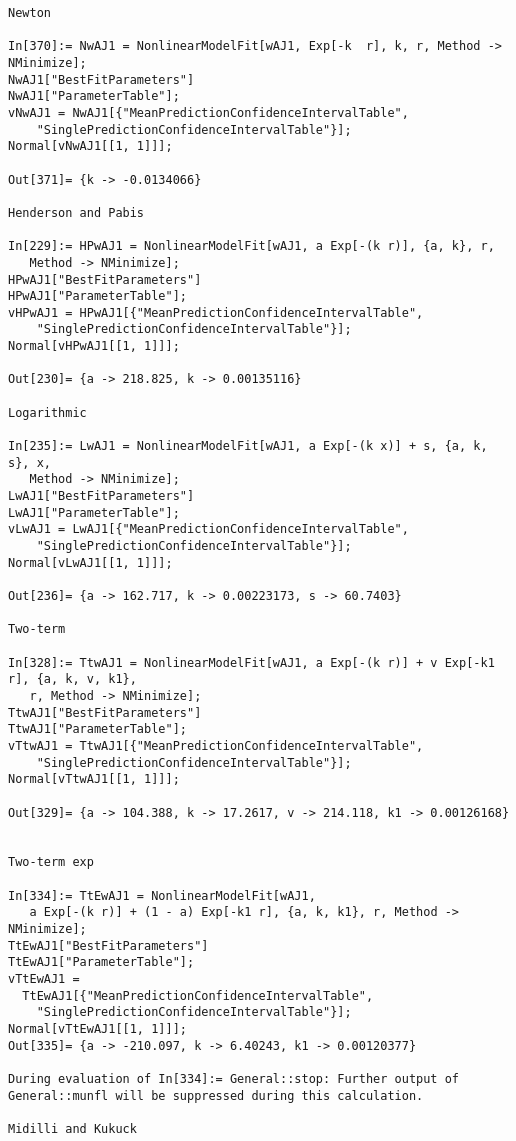 \begin{lstlisting}
Newton

In[370]:= NwAJ1 = NonlinearModelFit[wAJ1, Exp[-k  r], k, r, Method -> NMinimize];
NwAJ1["BestFitParameters"]
NwAJ1["ParameterTable"];
vNwAJ1 = NwAJ1[{"MeanPredictionConfidenceIntervalTable", 
    "SinglePredictionConfidenceIntervalTable"}];
Normal[vNwAJ1[[1, 1]]];

Out[371]= {k -> -0.0134066}

Henderson and Pabis

In[229]:= HPwAJ1 = NonlinearModelFit[wAJ1, a Exp[-(k r)], {a, k}, r, 
   Method -> NMinimize];
HPwAJ1["BestFitParameters"]
HPwAJ1["ParameterTable"];
vHPwAJ1 = HPwAJ1[{"MeanPredictionConfidenceIntervalTable", 
    "SinglePredictionConfidenceIntervalTable"}];
Normal[vHPwAJ1[[1, 1]]];

Out[230]= {a -> 218.825, k -> 0.00135116}

Logarithmic

In[235]:= LwAJ1 = NonlinearModelFit[wAJ1, a Exp[-(k x)] + s, {a, k, s}, x, 
   Method -> NMinimize];
LwAJ1["BestFitParameters"]
LwAJ1["ParameterTable"];
vLwAJ1 = LwAJ1[{"MeanPredictionConfidenceIntervalTable", 
    "SinglePredictionConfidenceIntervalTable"}];
Normal[vLwAJ1[[1, 1]]];

Out[236]= {a -> 162.717, k -> 0.00223173, s -> 60.7403}

Two-term

In[328]:= TtwAJ1 = NonlinearModelFit[wAJ1, a Exp[-(k r)] + v Exp[-k1 r], {a, k, v, k1}, 
   r, Method -> NMinimize];
TtwAJ1["BestFitParameters"]
TtwAJ1["ParameterTable"];
vTtwAJ1 = TtwAJ1[{"MeanPredictionConfidenceIntervalTable", 
    "SinglePredictionConfidenceIntervalTable"}];
Normal[vTtwAJ1[[1, 1]]];

Out[329]= {a -> 104.388, k -> 17.2617, v -> 214.118, k1 -> 0.00126168}


Two-term exp

In[334]:= TtEwAJ1 = NonlinearModelFit[wAJ1, 
   a Exp[-(k r)] + (1 - a) Exp[-k1 r], {a, k, k1}, r, Method -> NMinimize];
TtEwAJ1["BestFitParameters"]
TtEwAJ1["ParameterTable"];
vTtEwAJ1 = 
  TtEwAJ1[{"MeanPredictionConfidenceIntervalTable", 
    "SinglePredictionConfidenceIntervalTable"}];
Normal[vTtEwAJ1[[1, 1]]];
Out[335]= {a -> -210.097, k -> 6.40243, k1 -> 0.00120377}

During evaluation of In[334]:= General::stop: Further output of General::munfl will be suppressed during this calculation.

Midilli and Kukuck


\end{lstlisting}
